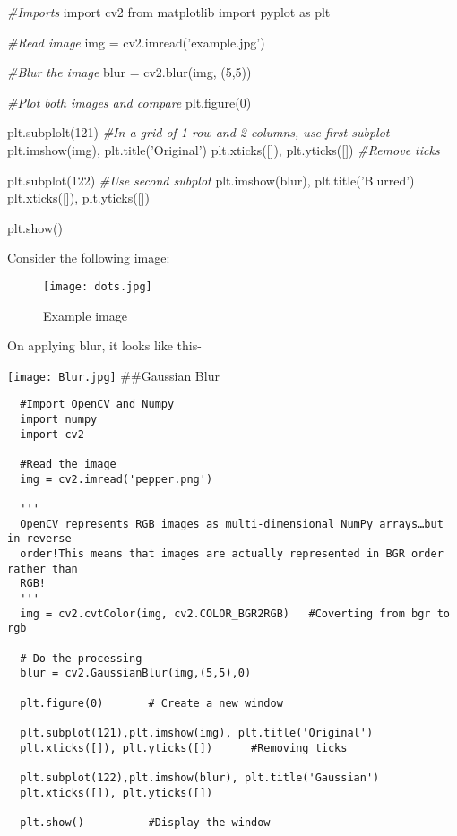 \documentclass[]{article}
\newenvironment{Shaded}{}{}
\newcommand{\DecValTok}[1]{\textcolor[rgb]{0.25,0.63,0.44}{{#1}}}
\newcommand{\StringTok}[1]{\textcolor[rgb]{0.25,0.44,0.63}{{#1}}}
\newcommand{\ImportTok}[1]{{#1}}
\newcommand{\CommentTok}[1]{\textcolor[rgb]{0.38,0.63,0.69}{\textit{{#1}}}}
\newcommand{\OperatorTok}[1]{\textcolor[rgb]{0.40,0.40,0.40}{{#1}}}
\newcommand{\NormalTok}[1]{{#1}}
\begin{document}
\begin{Shaded}
\begin{Highlighting}[]
    \CommentTok{#Imports}
    \ImportTok{import} \NormalTok{cv2}
    \ImportTok{from} \NormalTok{matplotlib }\ImportTok{import} \NormalTok{pyplot }\ImportTok{as} \NormalTok{plt}
    
    \CommentTok{#Read image}
    \NormalTok{img }\OperatorTok{=} \NormalTok{cv2.imread(}\StringTok{'example.jpg'}\NormalTok{)}

    \CommentTok{#Blur the image}
    \NormalTok{blur }\OperatorTok{=} \NormalTok{cv2.blur(img, (}\DecValTok{5}\NormalTok{,}\DecValTok{5}\NormalTok{))}

    \CommentTok{#Plot both images and compare}
    \NormalTok{plt.figure(}\DecValTok{0}\NormalTok{)}
    
    \NormalTok{plt.subplolt(}\DecValTok{121}\NormalTok{) }\CommentTok{#In a grid of 1 row and 2 columns, use first subplot}
    \NormalTok{plt.imshow(img), plt.title(}\StringTok{'Original'}\NormalTok{)}
    \NormalTok{plt.xticks([]), plt.yticks([]) }\CommentTok{#Remove ticks}

    \NormalTok{plt.subplot(}\DecValTok{122}\NormalTok{) }\CommentTok{#Use second subplot}
    \NormalTok{plt.imshow(blur), plt.title(}\StringTok{'Blurred'}\NormalTok{)}
    \NormalTok{plt.xticks([]), plt.yticks([])}

    \NormalTok{plt.show()}
\end{Highlighting}
\end{Shaded}

Consider the following image:

\begin{figure}[htbp]
\centering
\texttt{[image: dots.jpg]}
\caption{Example image}
\end{figure}

On applying blur, it looks like this-

\texttt{[image: Blur.jpg]}
\#\#Gaussian Blur

\begin{verbatim}
  #Import OpenCV and Numpy
  import numpy
  import cv2

  #Read the image
  img = cv2.imread('pepper.png')

  '''
  OpenCV represents RGB images as multi-dimensional NumPy arrays…but in reverse
  order!This means that images are actually represented in BGR order rather than
  RGB!
  '''
  img = cv2.cvtColor(img, cv2.COLOR_BGR2RGB)   #Coverting from bgr to rgb

  # Do the processing
  blur = cv2.GaussianBlur(img,(5,5),0)

  plt.figure(0)       # Create a new window

  plt.subplot(121),plt.imshow(img), plt.title('Original')
  plt.xticks([]), plt.yticks([])      #Removing ticks

  plt.subplot(122),plt.imshow(blur), plt.title('Gaussian')
  plt.xticks([]), plt.yticks([])

  plt.show()          #Display the window
\end{verbatim}
\end{document}
